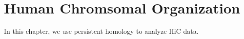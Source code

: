 
\chapter{Human Chromsomal Organization}
\label{ch:human_chromatin_folding}

In this chapter, we use persistent homology to analyze HiC data.

\lipsum
